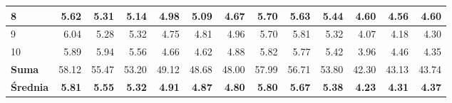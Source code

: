 \begin{table}[]
{{\begin{tabular}{|l|r|r|r|r|r|r|r|r|r|r|r|r|}
8                                                             & 5.62                             & 5.31                              & 5.14                               & 4.98                             & 5.09                              & 4.67                               & 5.70                             & 5.63                              & 5.44                               & 4.60                             & 4.56                              & 4.60                               \\ \hline
9                                                             & 6.04                             & 5.28                              & 5.32                               & 4.75                             & 4.81                              & 4.96                               & 5.70                             & 5.81                              & 5.32                               & 4.07                             & 4.18                              & 4.30                               \\ \hline
10                                                            & 5.89                             & 5.94                              & 5.56                               & 4.66                             & 4.62                              & 4.88                               & 5.82                             & 5.77                              & 5.42                               & 3.96                             & 4.46                              & 4.35                               \\ \hline\hline
\textbf{Suma}                                                 & 58.12                            & 55.47                             & 53.20                              & 49.12                            & 48.68                             & 48.00                              & 57.99                            & 56.71                             & 53.80                              & 42.30                            & 43.13                             & 43.74                              \\ \hline
\textbf{Średnia}                                              & \textbf{5.81}                    & \textbf{5.55}                     & \textbf{5.32}                      & \textbf{4.91}                    & \textbf{4.87}                     & \textbf{4.80}                      & \textbf{5.80}                    & \textbf{5.67}                     & \textbf{5.38}                      & \textbf{4.23}                    & \textbf{4.31}                     & \textbf{4.37}                      \\ \hline

\end{tabular}}}
\end{table}
